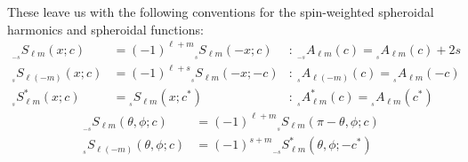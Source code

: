 \documentclass[11pt]{article}
\newcommand{\swSH}[5][]{{}_{{}_{#2}}S^{#1}_{#3}(#4;#5)}
\newcommand{\swS}[5][]{{}_{{}_{#2}}S^{#1}_{#3}(#4;#5)}
\newcommand{\scA}[4][]{{}_{{}_{#2}}A^{#1}_{#3}(#4)}
\begin{document}
\noindent
These leave us with the following conventions for the spin-weighted spheroidal harmonics and spheroidal functions:
\begin{align}
\swS{-s}{\ell{m}}{x}{c} &= (-1)^{\ell+m}\swS{s}{\ell{m}}{-x}{c} 
           &:\ \scA{-s}{\ell{m}}{c} = \scA{s}{\ell{m}}{c} + 2s \\
\swS{s}{\ell(-m)}{x}{c} &= (-1)^{\ell+s}\swS{s}{\ell{m}}{-x}{-c} 
           &:\ \scA{s}{\ell(-m)}{c} = \scA{s}{\ell{m}}{-c} \\
\swS[*]{s}{\ell{m}}{x}{c} &= \swS{s}{\ell{m}}{x}{c^*} 
           &:\ \scA[*]{s}{\ell{m}}{c} = \scA{s}{\ell{m}}{c^*}
\end{align}
\begin{align}\label{eqn:swSHminuss}
\swSH{-s}{\ell{m}}{\theta,\phi}{c} &= (-1)^{\ell+m}\swSH{s}{\ell{m}}{\pi-\theta,\phi}{c} \\ \label{eqn:swSHminusm}
\swSH{s}{\ell(-m)}{\theta,\phi}{c} &= (-1)^{s+m}\swSH[*]{-s}{\ell{m}}{\theta,\phi}{-c^*}
\end{align}

\newpage
{}
\vspace{0.25in}
\end{document}
